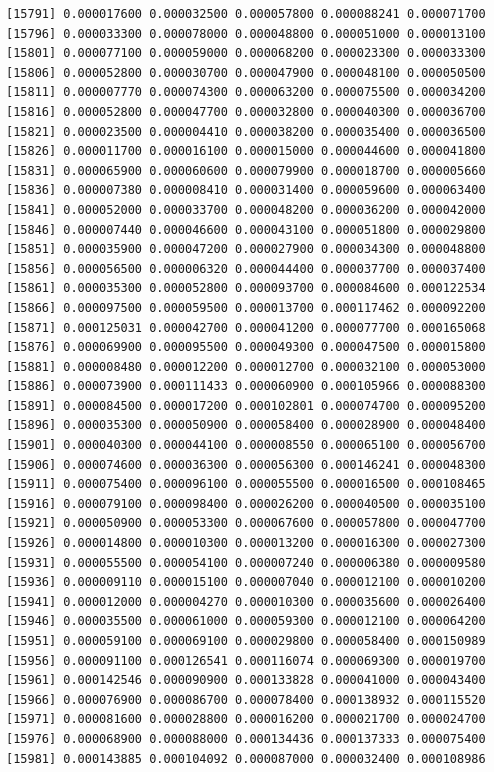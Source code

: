 \documentclass[]{article}
\begin{document}
\begin{verbatim}
[15791] 0.000017600 0.000032500 0.000057800 0.000088241 0.000071700
[15796] 0.000033300 0.000078000 0.000048800 0.000051000 0.000013100
[15801] 0.000077100 0.000059000 0.000068200 0.000023300 0.000033300
[15806] 0.000052800 0.000030700 0.000047900 0.000048100 0.000050500
[15811] 0.000007770 0.000074300 0.000063200 0.000075500 0.000034200
[15816] 0.000052800 0.000047700 0.000032800 0.000040300 0.000036700
[15821] 0.000023500 0.000004410 0.000038200 0.000035400 0.000036500
[15826] 0.000011700 0.000016100 0.000015000 0.000044600 0.000041800
[15831] 0.000065900 0.000060600 0.000079900 0.000018700 0.000005660
[15836] 0.000007380 0.000008410 0.000031400 0.000059600 0.000063400
[15841] 0.000052000 0.000033700 0.000048200 0.000036200 0.000042000
[15846] 0.000007440 0.000046600 0.000043100 0.000051800 0.000029800
[15851] 0.000035900 0.000047200 0.000027900 0.000034300 0.000048800
[15856] 0.000056500 0.000006320 0.000044400 0.000037700 0.000037400
[15861] 0.000035300 0.000052800 0.000093700 0.000084600 0.000122534
[15866] 0.000097500 0.000059500 0.000013700 0.000117462 0.000092200
[15871] 0.000125031 0.000042700 0.000041200 0.000077700 0.000165068
[15876] 0.000069900 0.000095500 0.000049300 0.000047500 0.000015800
[15881] 0.000008480 0.000012200 0.000012700 0.000032100 0.000053000
[15886] 0.000073900 0.000111433 0.000060900 0.000105966 0.000088300
[15891] 0.000084500 0.000017200 0.000102801 0.000074700 0.000095200
[15896] 0.000035300 0.000050900 0.000058400 0.000028900 0.000048400
[15901] 0.000040300 0.000044100 0.000008550 0.000065100 0.000056700
[15906] 0.000074600 0.000036300 0.000056300 0.000146241 0.000048300
[15911] 0.000075400 0.000096100 0.000055500 0.000016500 0.000108465
[15916] 0.000079100 0.000098400 0.000026200 0.000040500 0.000035100
[15921] 0.000050900 0.000053300 0.000067600 0.000057800 0.000047700
[15926] 0.000014800 0.000010300 0.000013200 0.000016300 0.000027300
[15931] 0.000055500 0.000054100 0.000007240 0.000006380 0.000009580
[15936] 0.000009110 0.000015100 0.000007040 0.000012100 0.000010200
[15941] 0.000012000 0.000004270 0.000010300 0.000035600 0.000026400
[15946] 0.000035500 0.000061000 0.000059300 0.000012100 0.000064200
[15951] 0.000059100 0.000069100 0.000029800 0.000058400 0.000150989
[15956] 0.000091100 0.000126541 0.000116074 0.000069300 0.000019700
[15961] 0.000142546 0.000090900 0.000133828 0.000041000 0.000043400
[15966] 0.000076900 0.000086700 0.000078400 0.000138932 0.000115520
[15971] 0.000081600 0.000028800 0.000016200 0.000021700 0.000024700
[15976] 0.000068900 0.000088000 0.000134436 0.000137333 0.000075400
[15981] 0.000143885 0.000104092 0.000087000 0.000032400 0.000108986

\end{verbatim}
\end{document}
